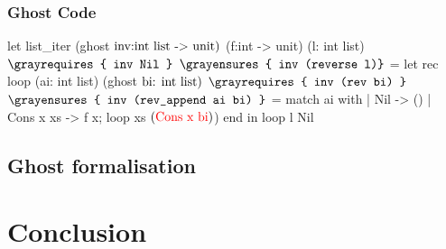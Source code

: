 \begin{frame}[fragile]
\frametitle{Ghost Code}
\begin{footnotesize}
\begin{whycode}
let list_iter (ghost $\textcolor{black}{\text{inv:int list -> unit}})$ 
    (f:int -> unit) (l: int list)
     ${\gray\texttt{requires \{ inv Nil \}}}$
     ${\gray\texttt{ensures \{ inv (reverse l)\}}}$    
 = let rec loop (ai: int list) (ghost$\textcolor{black}{\text{ bi: int list}})$
      ${\gray\texttt{requires \{ inv (rev bi) \} }}$
      ${\gray\texttt{ensures  \{ inv (rev\_append ai bi) \}}}$  
    = match ai with 
       | Nil       -> ()
       | Cons x xs -> f x; loop xs $(\textcolor{red}{\text{Cons x bi}})$) end
   in loop l Nil
\end{whycode}
\end{footnotesize}
\end{frame}

\subsection*{Ghost formalisation}

\section*{Conclusion}




